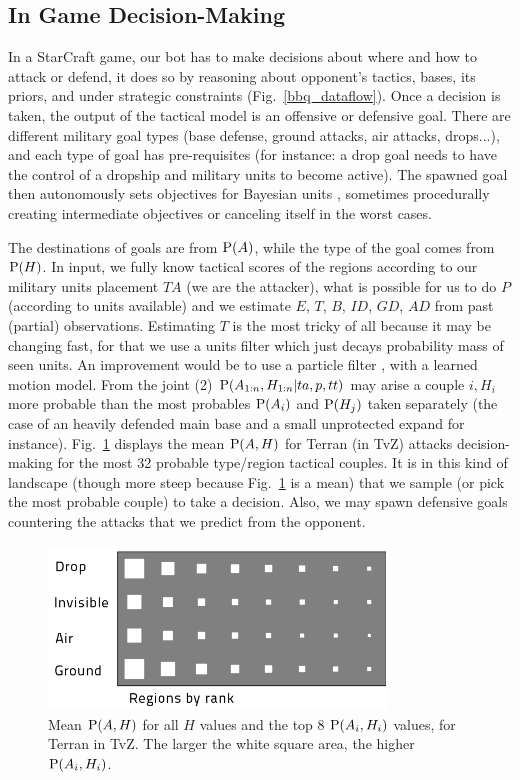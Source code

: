\subsection{In Game Decision-Making}
In a StarCraft game, our bot has to make decisions about where and how to attack or defend, it does so by reasoning about opponent's tactics, bases, its priors, and under strategic constraints (Fig.~\ref{bbq_dataflow}). Once a decision is taken, the output of the tactical model is an offensive or defensive goal. There are different military goal types (base defense, ground attacks, air attacks, drops...), and each type of goal has pre-requisites (for instance: a drop goal needs to have the control of a dropship and military units to become active). The spawned goal then autonomously sets objectives for Bayesian units \cite{SYNNAEVE:Micro}, sometimes procedurally creating intermediate objectives or canceling itself in the worst cases. 

The destinations of goals are from $\mathrm{P}(A)$, while the type of the goal comes from $\mathrm{P}(H)$. In input, we fully know tactical scores of the regions according to our military units placement $TA$ (we are the attacker), what is possible for us to do $P$ (according to units available) and we estimate $E$, $T$, $B$, $ID$, $GD$, $AD$ from past (partial) observations. Estimating $T$ is the most tricky of all because it may be changing fast, for that we use a units filter which just decays probability mass of seen units. An improvement would be to use a particle filter \cite{weber2011aiide}, with a learned motion model. From the joint (2) $\mathrm{P}(A_{1:n},H_{1:n}|ta,p,tt)$ may arise a couple $i,H_i$ more probable than the most probables $\mathrm{P}(A_i)$ and $\mathrm{P}(H_j)$ taken separately (the case of an heavily defended main base and a small unprotected expand for instance). Fig.~\ref{fig:WhereHow} displays the mean $\mathrm{P}(A,H)$ for Terran (in TvZ) attacks decision-making for the most 32 probable type/region tactical couples. It is in this kind of landscape (though more steep because Fig.~\ref{fig:WhereHow} is a mean) that we sample (or pick the most probable couple) to take a decision. Also, we may spawn defensive goals countering the attacks that we predict from the opponent.

\begin{figure}[htp]
\centerline{\includegraphics[width=9cm]{images/WhereHow_T_TvZ_light.png}}
\caption{Mean $\mathrm{P}(A,H)$ for all $H$ values and the top 8 $\mathrm{P}(A_i,H_i)$ values, for Terran in TvZ. The larger the white square area, the higher $\mathrm{P}(A_i,H_i)$.}
\label{fig:WhereHow}
\end{figure}

